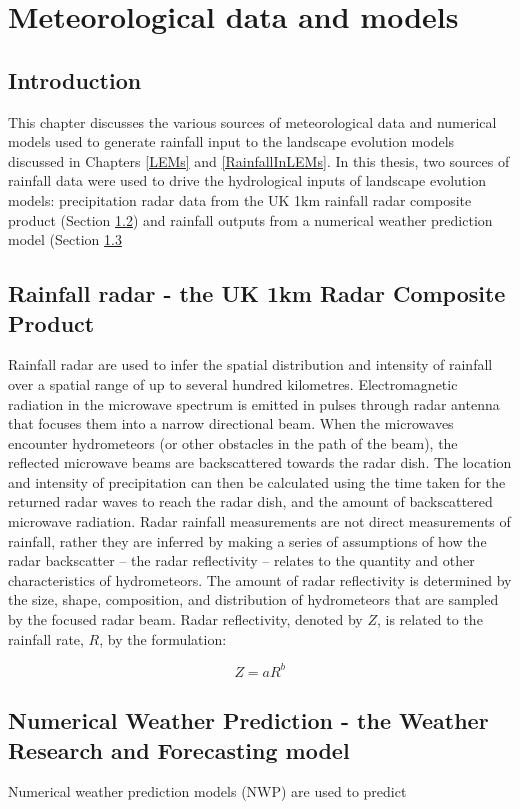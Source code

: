 \chapter{Meteorological data and models}
\label{MetData}

\section{Introduction}
This chapter discusses the various sources of meteorological data and numerical models used to generate rainfall input to the landscape evolution models discussed in Chapters \ref{LEMs} and \ref{RainfallInLEMs}. In this thesis, two sources of rainfall data were used to drive the hydrological inputs of landscape evolution models: precipitation radar data from the UK 1km rainfall radar composite product (Section \ref{NIMROD}) and rainfall outputs from a numerical weather prediction model (Section \ref{WRF}

\section{Rainfall radar - the UK 1km Radar Composite Product}
\label{NIMROD}

Rainfall radar are used to infer the spatial distribution and intensity of rainfall over a spatial range of up to several hundred kilometres. Electromagnetic radiation in the microwave spectrum is emitted in pulses through radar antenna that focuses them into a narrow directional beam. When the microwaves encounter hydrometeors (or other obstacles in the path of the beam), the reflected microwave beams are backscattered towards the radar dish. The location and intensity of precipitation can then be calculated using the time taken for the returned radar waves to reach the radar dish, and the amount of backscattered microwave radiation. Radar rainfall measurements are not direct measurements of rainfall, rather they are inferred by making a series of assumptions of how the radar backscatter -- the radar reflectivity -- relates to the quantity and other characteristics of hydrometeors. The amount of radar reflectivity is determined by the size, shape, composition, and distribution of hydrometeors that are sampled by the focused radar beam. Radar reflectivity, denoted by \(Z\), is related to the rainfall rate, \(R\), by the formulation:

\begin{equation}
Z = aR^b
\end{equation}

\section{Numerical Weather Prediction - the Weather Research and Forecasting model}
\label{WRF}

Numerical weather prediction models (NWP) are used to predict 